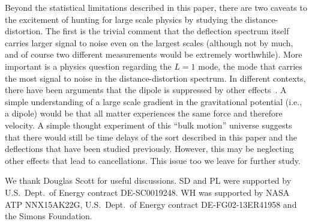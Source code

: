 \documentclass[prd,amsmath,amssymb,floatfix,superscriptaddress,nofootinbib,twocolumn]{revtex4-1}
\begin{document}
Beyond the statistical limitations described in this paper, there are two caveats to the excitement of hunting for large scale physics by studying the distance-distortion. The first is the trivial comment that the deflection spectrum itself carries larger signal to noise even on the largest scales (although not by much, and of course two different measurements would be extremely worthwhile). More important is a physics question regarding the $L=1$ mode, the mode that carries the most signal to noise in the distance-distortion spectrum. In different contexts, there have been arguments that the dipole is suppressed by other effects~\cite{Zibin:2008fe,Itoh:2009vc}. A simple understanding of a large scale gradient in the gravitational potential (i.e., a dipole) would be that all matter experiences the same force and therefore velocity. A simple thought experiment of this ``bulk motion'' universe suggests that there would still be time delays of the sort described in this paper and the deflections that have been studied previously. However, this may be neglecting other effects that lead to cancellations. This issue too we leave for further study.

\acknowledgements

We thank Douglas Scott for useful discussions.  SD and PL were supported by U.S.\ Dept.\ of Energy contract DE-SC0019248.
 WH was supported by NASA ATP NNX15AK22G, U.S.\ Dept.\ of Energy contract DE-FG02-13ER41958
and  the Simons Foundation. 



%

\end{document}
